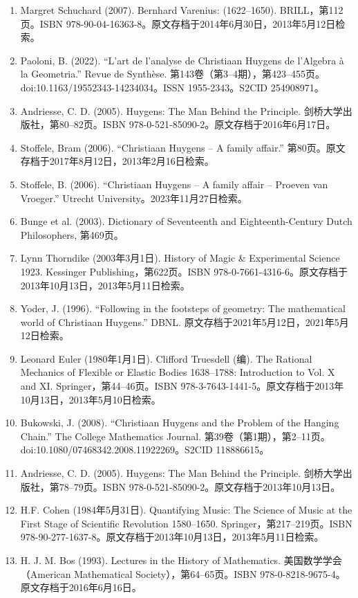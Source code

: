 \begin{enumerate}
\item Margret Schuchard (2007). Bernhard Varenius: (1622–1650). BRILL，第112页。ISBN 978-90-04-16363-8。原文存档于2014年6月30日，2013年5月12日检索。
\item Paoloni, B. (2022). “L'art de l'analyse de Christiaan Huygens de l'Algebra à la Geometria.” Revue de Synthèse. 第143卷（第3–4期），第423–455页。doi:10.1163/19552343-14234034。ISSN 1955-2343。S2CID 254908971。
\item Andriesse, C. D. (2005). Huygens: The Man Behind the Principle. 剑桥大学出版社，第80–82页。ISBN 978-0-521-85090-2。原文存档于2016年6月17日。
\item Stoffele, Bram (2006). “Christiaan Huygens – A family affair.” 第80页。原文存档于2017年8月12日，2013年2月16日检索。
\item Stoffele, B. (2006). “Christiaan Huygens – A family affair – Proeven van Vroeger.” Utrecht University。2023年11月27日检索。
\item Bunge et al. (2003). Dictionary of Seventeenth and Eighteenth-Century Dutch Philosophers, 第469页。
\item Lynn Thorndike (2003年3月1日). History of Magic & Experimental Science 1923. Kessinger Publishing，第622页。ISBN 978-0-7661-4316-6。原文存档于2013年10月13日，2013年5月11日检索。
\item Yoder, J. (1996). “Following in the footsteps of geometry: The mathematical world of Christiaan Huygens.” DBNL. 原文存档于2021年5月12日，2021年5月12日检索。
\item Leonard Euler (1980年1月1日). Clifford Truesdell (编). The Rational Mechanics of Flexible or Elastic Bodies 1638–1788: Introduction to Vol. X and XI. Springer，第44–46页。ISBN 978-3-7643-1441-5。原文存档于2013年10月13日，2013年5月10日检索。
\item Bukowski, J. (2008). “Christiaan Huygens and the Problem of the Hanging Chain.” The College Mathematics Journal. 第39卷（第1期），第2–11页。doi:10.1080/07468342.2008.11922269。S2CID 118886615。
\item Andriesse, C. D. (2005). Huygens: The Man Behind the Principle. 剑桥大学出版社，第78–79页。ISBN 978-0-521-85090-2。原文存档于2013年10月13日。
\item H.F. Cohen (1984年5月31日). Quantifying Music: The Science of Music at the First Stage of Scientific Revolution 1580–1650. Springer，第217–219页。ISBN 978-90-277-1637-8。原文存档于2013年10月13日，2013年5月11日检索。
\item H. J. M. Bos (1993). Lectures in the History of Mathematics. 美国数学学会（American Mathematical Society），第64–65页。ISBN 978-0-8218-9675-4。原文存档于2016年6月16日。

\end{enumerate}

